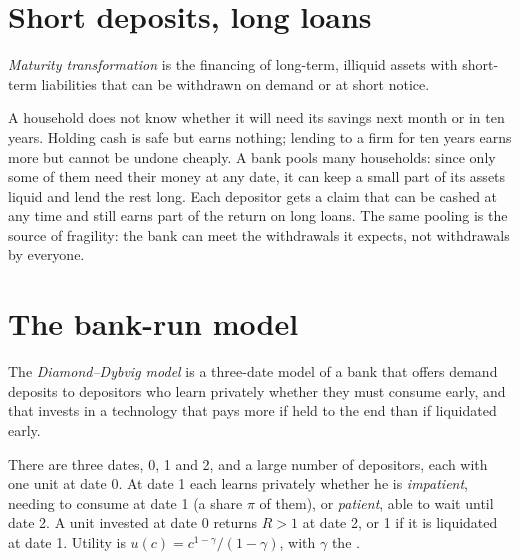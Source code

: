 \section{Short deposits, long loans}\label{sec:b2:banks-and-crises:maturity}

\begin{definition}\label{def:b2:banks-and-crises:maturity-transformation}
\emph{Maturity transformation} is the financing of long-term, illiquid assets with
short-term liabilities that can be withdrawn on demand or at short notice.
\end{definition}

A household does not know whether it will need its savings next month or in ten years. Holding cash is safe but earns
nothing; lending to a firm for ten years earns more but cannot be undone cheaply. A bank pools many households: since only
some of them need their money at any date, it can keep a small part of its assets liquid and lend the rest long. Each
depositor gets a claim that can be cashed at any time and still earns part of the return on long loans. The same pooling is
the source of fragility: the bank can meet the withdrawals it expects, not withdrawals by everyone.

\section{The bank-run model}\label{sec:b2:banks-and-crises:dd}

\begin{definition}\label{def:b2:banks-and-crises:dd}
The \emph{Diamond--Dybvig model} is a three-date model of a bank that offers demand deposits
to depositors who learn privately whether they must consume early, and that invests in a technology that pays more if held
to the end than if liquidated early.
\end{definition}

There are three dates, 0, 1 and 2, and a large number of depositors, each with one unit at date 0. At date 1 each learns
privately whether he is \emph{impatient}, needing to consume at date 1 (a share $\pi$ of them), or \emph{patient}, able to
wait until date 2. A unit invested at date 0 returns $R > 1$ at date 2, or 1 if it is liquidated at date 1. Utility is
$u(c) = c^{1-\gamma}/(1 - \gamma)$, with $\gamma$ the .

